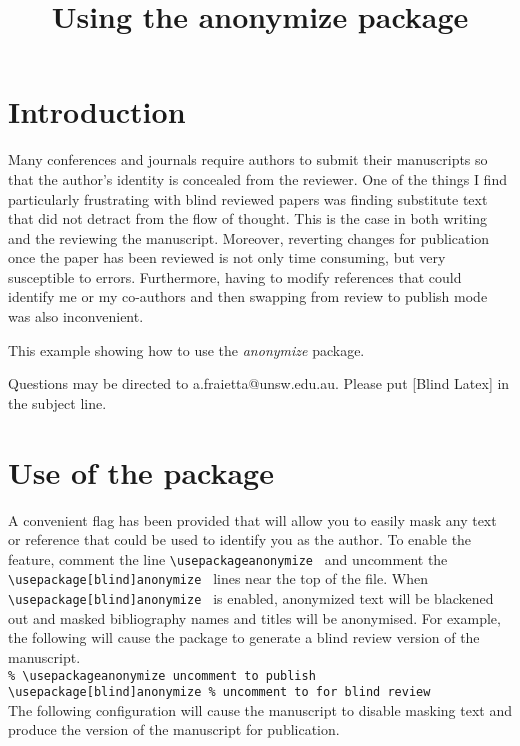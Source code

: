 \documentclass[a4paper,man,natbib]{apa6}
\title{Using the anonymize package}
\author{\anonymize{Angelo Fraietta}}
\affiliation{\anonymize{University of New South Wales}}
\begin{document}
\maketitle

\section{Introduction}
Many conferences and journals require authors to submit their manuscripts so that the author's identity is concealed from the reviewer. One of the things I find particularly frustrating with blind reviewed papers was finding substitute text that did not detract from the flow of thought. This is the case in both writing and the reviewing the manuscript. Moreover, reverting changes for publication  once the paper has been reviewed is not only time consuming, but very susceptible to errors. Furthermore, having to modify references that could identify me or my co-authors and then swapping from review to publish mode was also inconvenient.

This example showing how to use the \textit{anonymize} package. 

Questions may be directed to a.fraietta@unsw.edu.au. Please put [Blind Latex] in the subject line.

\section{Use of the package}
A convenient flag has been provided that will allow you to easily mask any text or reference that could be used to identify you as the author. To enable the feature, comment the line \texttt{\textbackslash usepackage{anonymize} } and uncomment the \texttt{\textbackslash usepackage[blind]{anonymize} } lines near the top of the file. When \texttt{\textbackslash usepackage[blind]{anonymize} } is enabled, anonymized text will be blackened out and masked bibliography names and titles will be anonymised. For example, the following will cause the package to generate a blind review version of the manuscript.\\

\texttt{\% \textbackslash usepackage{anonymize} uncomment to publish} \\
\texttt{\textbackslash usepackage[blind]{anonymize} \% uncomment to for blind review} \\

	
The following configuration will cause the manuscript to disable masking text and produce the version of the manuscript for publication.
\end{document}
